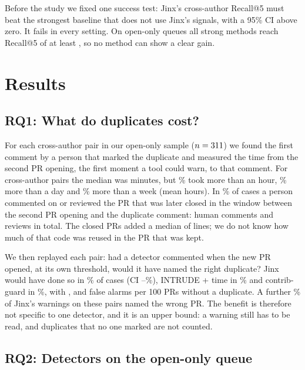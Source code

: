 \documentclass[10pt,conference]{IEEEtran}
\begin{document}
Before the study we fixed one success test: Jinx's cross-author Recall@5 must beat the strongest baseline that does not use Jinx's signals, with a 95\% CI above zero. It fails in every setting. On open-only queues all strong methods reach Recall@5 of at least \RFiveintrude, so no method can show a clear gain.

\section{Results}
\subsection{RQ1: What do duplicates cost?}
For each cross-author pair in our open-only sample ($n=311$) we found the first comment by a person that marked the duplicate and measured the time from the second PR opening, the first moment a tool could warn, to that comment. For cross-author pairs the median was \dupDelayMedMin{} minutes, but \dupLateOneH\% took more than an hour, \dupLateOneD\% more than a day and \dupLateSevenD\% more than a week (mean \dupDelayMeanH{} hours). In \dupEffort\% of cases a person commented on or reviewed the PR that was later closed in the window between the second PR opening and the duplicate comment: \dupComments{} human comments and \dupReviews{} reviews in total. The closed PRs added a median of \dupLinesMed{} lines; we do not know how much of that code was reused in the PR that was kept.

We then replayed each pair: had a detector commented when the new PR opened, at its own threshold, would it have named the right duplicate? Jinx would have done so in \replayWarn\% of cases (CI \replayWarnLo--\replayWarnHi\%), INTRUDE + time in \replayWarnIntrude\% and contrib-guard in \replayWarnCg\%, with \replayFA, \replayFAIntrude{} and \replayFACg{} false alarms per 100 PRs without a duplicate. A further \replayWrong\% of Jinx's warnings on these pairs named the wrong PR. The benefit is therefore not specific to one detector, and it is an upper bound: a warning still has to be read, and duplicates that no one marked are not counted.

\subsection{RQ2: Detectors on the open-only queue}
\begin{table}[t]\centering
\caption{Cross-author pairs on open-only queues ($n=\nCross$) and false alarms on \nNeg{} PRs without a duplicate. Bold: best in column. $\dagger$/$\ddagger$: more/fewer false alarms than Jinx, paired 95\% CI excludes zero. Last column: row minus Jinx in Recall@1 percentage points, paired 95\% CI (unadjusted). Recall@5 differences are all within noise. $^{*}$Measured on the \haikuNegN{} randomly sampled no-duplicate queries that Haiku scored in full; Jinx raises \FARsubjinx\% on the same sample.}\label{tab:main}
\setlength{\tabcolsep}{3pt}\footnotesize\resizebox{\columnwidth}{!}{}\end{table}
\end{document}
